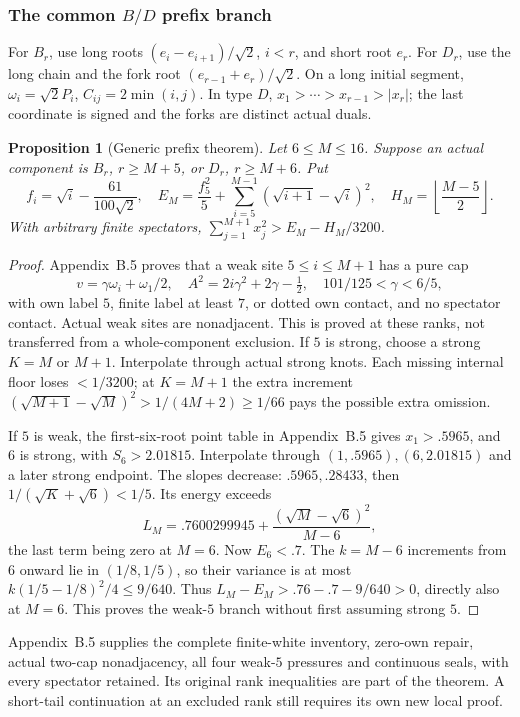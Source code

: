 \documentclass[11pt]{article}
\newtheorem{proposition}[theorem]{Proposition}
\theoremstyle{remark}\newtheorem{remark}[theorem]{Remark}
\numberwithin{equation}{section}
\begin{document}
\subsubsection[The common B/D prefix branch]{The common \(B/D\) prefix branch}
For \(B_r\), use long roots \((e_i-e_{i+1})/\sqrt2\), \(i<r\),
and short root \(e_r\). For \(D_r\), use the long chain and the
fork root \((e_{r-1}+e_r)/\sqrt2\). On a long initial segment,
\(\omega_i=\sqrt2P_i\), \(C_{ij}=2\min(i,j)\).
In type \(D\), \(x_1>\cdots>x_{r-1}>|x_r|\); the last
coordinate is signed and the forks are distinct actual duals.
\begin{proposition}[Generic prefix theorem]
\label{compact:prop:prefix}
Let \(6\leq M\leq16\). Suppose an actual component is \(B_r\),
\(r\geq M+5\), or \(D_r\), \(r\geq M+6\). Put
 \[
 f_i=\sqrt i-\frac{61}{100\sqrt2},\quad
 E_M=\frac{f_5^2}{5}+\sum_{i=5}^{M-1}(\sqrt{i+1}-\sqrt i)^2,
 \quad H_M=\left\lfloor\frac{M-5}{2}\right\rfloor.
\]
With arbitrary finite spectators,
\(\sum_{j=1}^{M+1}x_j^2>E_M-H_M/3200\).
\end{proposition}
\begin{proof}
Appendix~B.5 proves that a weak site
 \(5\leq i\leq M+1\) has a pure cap
 \[
 v=\gamma\omega_i+\omega_1/2,\quad
 A^2=2i\gamma^2+2\gamma-\tfrac12,\quad
 101/125<\gamma<6/5,
\]
with own label \(5\), finite label at least \(7\), or dotted own
contact, and no spectator contact. Actual weak sites are
nonadjacent. This is proved at these ranks, not transferred from
a whole-component exclusion.
If \(5\) is strong, choose a strong \(K=M\) or \(M+1\).
Interpolate through actual strong knots. Each missing internal
floor loses \(<1/3200\); at \(K=M+1\) the extra increment
 \((\sqrt{M+1}-\sqrt M)^2>1/(4M+2)\geq1/66\)
pays the possible extra omission.

If \(5\) is weak, the first-six-root point table in
Appendix~B.5 gives \(x_1>.5965\), and \(6\) is strong, with
 \(S_6>2.01815\). Interpolate through \((1,.5965),(6,2.01815)\)
and a later strong endpoint. The slopes decrease:
\(.5965,.28433\), then \(1/(\sqrt K+\sqrt6)<1/5\).
Its energy exceeds
 \[
 L_M=.7600299945+\frac{(\sqrt M-\sqrt6)^2}{M-6},
\]
the last term being zero at \(M=6\).
Now \(E_6<.7\). The \(k=M-6\) increments from \(6\) onward lie
in \((1/8,1/5)\), so their variance is at most
 \(k(1/5-1/8)^2/4\leq9/640\).
Thus \(L_M-E_M>.76-.7-9/640>0\), directly also at \(M=6\).
This proves the weak-\(5\) branch without first assuming strong \(5\).
\end{proof}
Appendix~B.5 supplies the complete
finite-white inventory, zero-own repair, actual two-cap
nonadjacency, all four weak-\(5\) pressures and continuous
seals, with every spectator retained. Its original rank
inequalities are part of the theorem. A short-tail continuation
at an excluded rank still requires its own new local proof.
\end{document}

